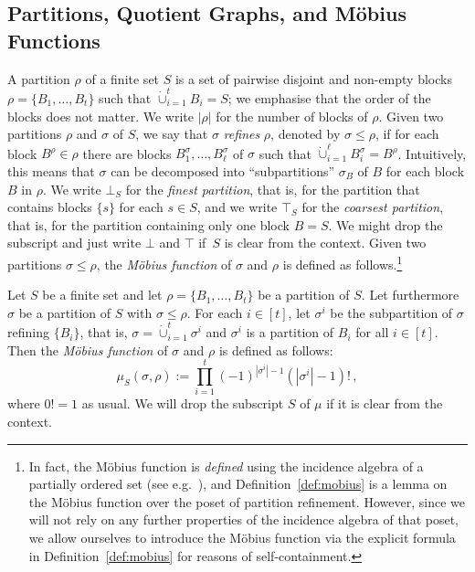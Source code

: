 \documentclass[authorcolumns,numberwithinsect]{no-lipics-v2022}
\begin{document}
\subsection{Partitions, Quotient Graphs, and M\"obius Functions}\label{sec:parts_quots_mobius}
A partition $\rho$ of a finite set $S$ is a set of pairwise disjoint and non-empty blocks $\rho=\{B_1,\dots,B_t\}$ such that $\dot\cup_{i=1}^t B_i = S$; we emphasise that the order of the blocks does not matter. We write $|\rho|$ for the number of blocks of $\rho$. Given two partitions $\rho$ and $\sigma$ of $S$, we say that $\sigma$ \emph{refines} $\rho$, denoted by $\sigma \leq \rho$, if for each block $B^\rho\in \rho$ there are blocks $B_1^\sigma,\dots,B_\ell^\sigma$ of $\sigma$ such that $\dot\cup_{i=1}^\ell B^\sigma_i = B^\rho$. Intuitively, this means that $\sigma$ can be decomposed into ``subpartitions'' $\sigma_B$ of $B$ for each block $B$ in $\rho$. We write $\bot_S$ for the \emph{finest partition}, that is, for the partition that contains blocks $\{s\}$ for each $s\in S$, and we write $\top_S$ for the \emph{coarsest partition}, that is, for the partition containing only one block $B=S$. We might drop the subscript and just write $\bot$ and $\top$ if~$S$ is clear from the context.
Given two partitions $\sigma \leq \rho$, the \emph{M\"obius function} of $\sigma$ and $\rho$ is defined as follows.\footnote{In fact, the M\"obius function is \emph{defined} using the incidence algebra of a partially ordered set (see e.g.\ \cite[Chapter 3.6]{Stanley11}), and Definition~\ref{def:mobius} is a lemma on the M\"obius function over the poset of partition refinement. However, since we will not rely on any further properties of the incidence algebra of that poset, we allow ourselves to introduce the M\"obius function via the explicit formula in Definition~\ref{def:mobius} for reasons of self-containment.}

\begin{definition}\label{def:mobius}
    Let $S$ be a finite set and let $\rho=\{B_1,\dots,B_t\}$ be a partition of $S$. Let furthermore $\sigma$ be a partition of $S$ with $\sigma \leq \rho$. For each $i\in [t]$, let $\sigma^i$ be the subpartition of $\sigma$ refining $\{B_i\}$, that is, $\sigma = \dot{\cup}_{i=1}^t \sigma^i$ and $\sigma^i$ is a partition of $B_i$ for all $i\in [t]$. Then the \emph{M\"obius function} of $\sigma$ and $\rho$ is defined as follows:
    \[ \mu_S(\sigma,\rho):=  \prod_{i=1}^t (-1)^{|\sigma^i|-1}(|\sigma^i|-1)! \,,\]
    where $0!=1$ as usual. We will drop the subscript $S$ of $\mu$ if it is clear from the context.
\end{definition}
\end{document}
